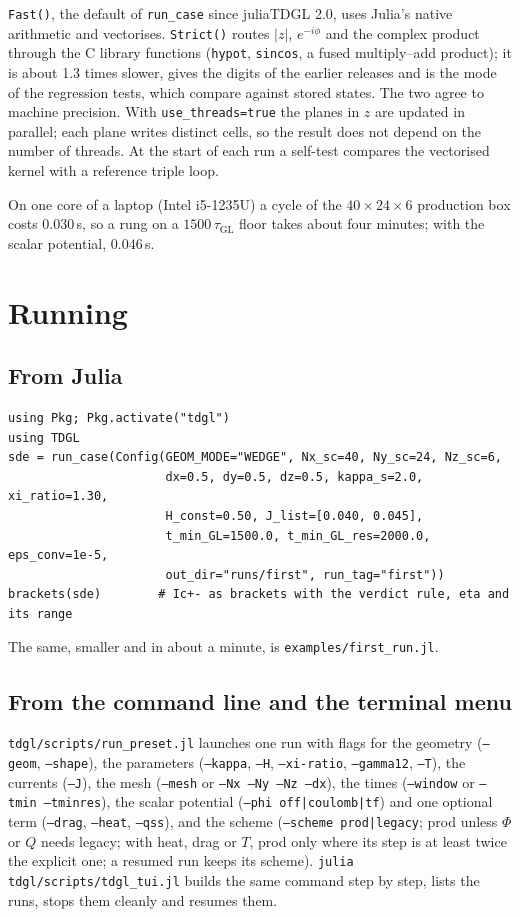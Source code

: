 \documentclass[11pt,a4paper]{article}
\newcommand{\tGL}{\tau_{\mathrm{GL}}}
\newcommand{\code}[1]{\texttt{#1}}
\begin{document}
\code{Fast()}, the default of \code{run\_case} since juliaTDGL 2.0, uses Julia's native arithmetic and
vectorises. \code{Strict()} routes $|z|$, $e^{-i\phi}$ and the complex product through the C library
functions (\code{hypot}, \code{sincos}, a fused multiply--add product); it is about 1.3 times slower, gives
the digits of the earlier releases and is the mode of the regression tests, which compare against stored
states. The two agree to machine precision. With
\code{use\_threads=true} the planes in $z$ are updated in parallel; each
plane writes distinct cells, so the result does not depend on the number of
threads. At the start of each run a self-test
compares the vectorised kernel with a reference triple loop.

On one core of a laptop (Intel i5-1235U) a cycle of the
$40\times24\times6$ production box costs $0.030$\,s, so a rung on a
$1500\,\tGL$ floor takes about four minutes; with the scalar potential,
$0.046$\,s.

\section{Running}

\subsection{From Julia}
\begin{verbatim}
using Pkg; Pkg.activate("tdgl")
using TDGL
sde = run_case(Config(GEOM_MODE="WEDGE", Nx_sc=40, Ny_sc=24, Nz_sc=6,
                      dx=0.5, dy=0.5, dz=0.5, kappa_s=2.0, xi_ratio=1.30,
                      H_const=0.50, J_list=[0.040, 0.045],
                      t_min_GL=1500.0, t_min_GL_res=2000.0, eps_conv=1e-5,
                      out_dir="runs/first", run_tag="first"))
brackets(sde)        # Ic+- as brackets with the verdict rule, eta and its range
\end{verbatim}
The same, smaller and in about a minute, is \code{examples/first\_run.jl}.

\subsection{From the command line and the terminal menu}

\code{tdgl/scripts/run\_preset.jl} launches one run with flags for the
geometry (\code{--geom}, \code{--shape}), the parameters (\code{--kappa},
\code{--H}, \code{--xi-ratio}, \code{--gamma12}, \code{--T}), the currents
(\code{--J}), the mesh (\code{--mesh} or \code{--Nx --Ny --Nz --dx}), the
times (\code{--window} or \code{--tmin --tminres}), the scalar potential
(\code{--phi off|coulomb|tf}) and one optional term (\code{--drag},
\code{--heat}, \code{--qss}), and the scheme (\code{--scheme prod|legacy};
prod unless $\Phi$ or $Q$ needs legacy; with heat, drag or $T$, prod only where
its step is at least twice the explicit one; a resumed run keeps its
scheme). \code{julia tdgl/scripts/tdgl\_tui.jl} builds
the same command step by step, lists the runs, stops them cleanly and
resumes them.
\end{document}
